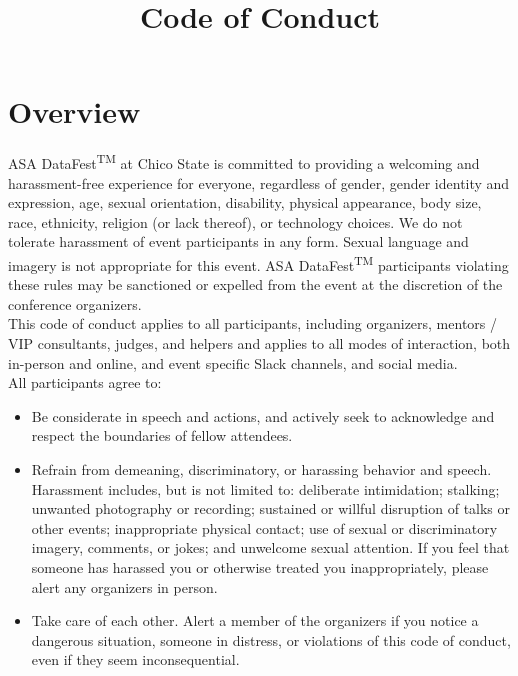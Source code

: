 \documentclass{article}
\title{Code of Conduct}
\date{}
\begin{document}
\maketitle

\section*{Overview}

ASA DataFest\textsuperscript{TM} at Chico State is committed to providing a welcoming and harassment-free experience for everyone, regardless of gender, gender identity and expression, age, sexual orientation, disability, physical appearance, body size, race, ethnicity, religion (or lack thereof), or technology choices. We do not tolerate harassment of event participants in any form. Sexual language and imagery is not appropriate for this event. ASA DataFest\textsuperscript{TM} participants violating these rules may be sanctioned or expelled from the event at the discretion of the conference organizers.\\

This code of conduct applies to all participants, including organizers, mentors / VIP consultants, judges, and helpers and applies to all modes of interaction, both in-person and online, and event specific Slack channels, and social media.\\

All participants agree to:

\begin{itemize}
  \item Be considerate in speech and actions, and actively seek to acknowledge and respect the boundaries of fellow attendees.
  \item Refrain from demeaning, discriminatory, or harassing behavior and speech. Harassment includes, but is not limited to: deliberate intimidation; stalking; unwanted photography or recording; sustained or willful disruption of talks or other events; inappropriate physical contact; use of sexual or discriminatory imagery, comments, or jokes; and unwelcome sexual attention. If you feel that someone has harassed you or otherwise treated you inappropriately, please alert any organizers in person.
  \item Take care of each other. Alert a member of the organizers if you notice a dangerous situation, someone in distress, or violations of this code of conduct, even if they seem inconsequential.
\end{itemize}
\end{document}
